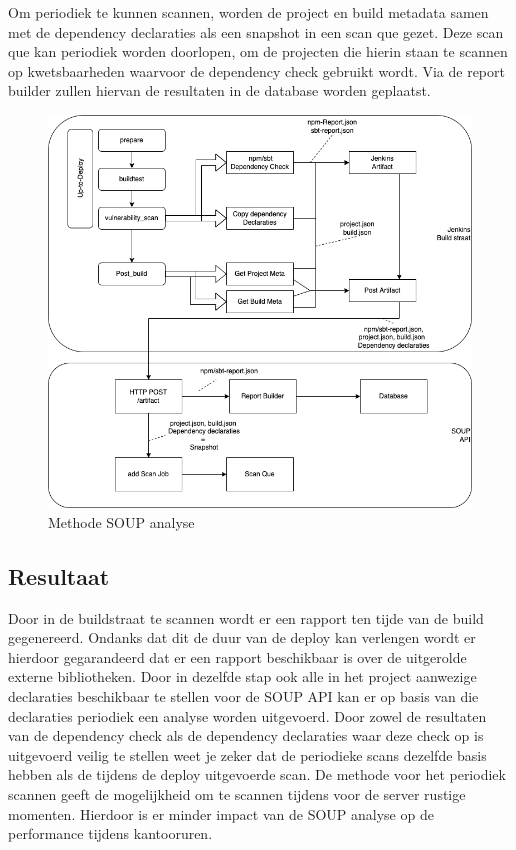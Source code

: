 \begin{itemize}
    Om periodiek te kunnen scannen, worden de project en build metadata samen met de dependency declaraties als een snapshot in een scan que gezet. Deze scan que kan periodiek worden doorlopen, om de projecten die hierin staan te scannen op kwetsbaarheden waarvoor de dependency check gebruikt wordt. Via de report builder zullen hiervan de resultaten in de database worden geplaatst.

    \begin{figure}
        \centering
        \includegraphics[width=15cm]{gfx/methode_Jenkins}
        \caption{Methode SOUP analyse}
        \label{fig:methodeSOUPanalyse}
    \end{figure}

    \subsection{Resultaat}
    Door in de buildstraat te scannen wordt er een rapport ten tijde van de build gegenereerd. Ondanks dat dit de duur van de deploy kan verlengen wordt er hierdoor gegarandeerd dat er een rapport beschikbaar is over de uitgerolde externe bibliotheken. Door in dezelfde stap ook alle in het project aanwezige declaraties beschikbaar te stellen voor de SOUP API kan er op basis van die declaraties periodiek een analyse worden uitgevoerd. Door zowel de resultaten van de dependency check als de dependency declaraties waar deze check op is uitgevoerd veilig te stellen weet je zeker dat de periodieke scans dezelfde basis hebben als de tijdens de deploy uitgevoerde scan. De methode voor het periodiek scannen geeft de mogelijkheid om te scannen tijdens voor de server rustige momenten. Hierdoor is er minder impact van de SOUP analyse op de performance tijdens kantooruren.


\end{itemize}

